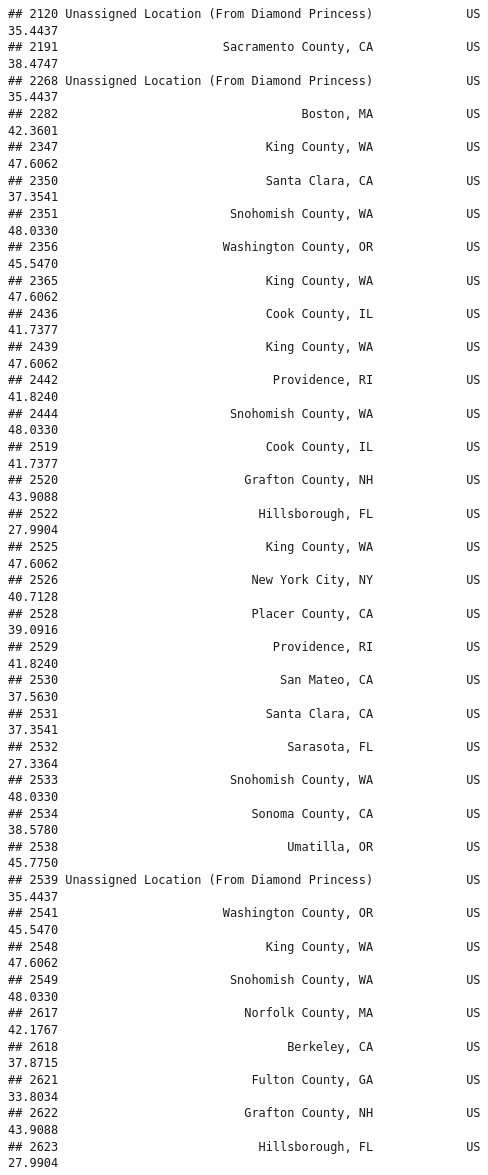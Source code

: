 \documentclass[
]{article}
\begin{document}
\begin{verbatim}
## 2120 Unassigned Location (From Diamond Princess)             US 35.4437
## 2191                       Sacramento County, CA             US 38.4747
## 2268 Unassigned Location (From Diamond Princess)             US 35.4437
## 2282                                  Boston, MA             US 42.3601
## 2347                             King County, WA             US 47.6062
## 2350                             Santa Clara, CA             US 37.3541
## 2351                        Snohomish County, WA             US 48.0330
## 2356                       Washington County, OR             US 45.5470
## 2365                             King County, WA             US 47.6062
## 2436                             Cook County, IL             US 41.7377
## 2439                             King County, WA             US 47.6062
## 2442                              Providence, RI             US 41.8240
## 2444                        Snohomish County, WA             US 48.0330
## 2519                             Cook County, IL             US 41.7377
## 2520                          Grafton County, NH             US 43.9088
## 2522                            Hillsborough, FL             US 27.9904
## 2525                             King County, WA             US 47.6062
## 2526                           New York City, NY             US 40.7128
## 2528                           Placer County, CA             US 39.0916
## 2529                              Providence, RI             US 41.8240
## 2530                               San Mateo, CA             US 37.5630
## 2531                             Santa Clara, CA             US 37.3541
## 2532                                Sarasota, FL             US 27.3364
## 2533                        Snohomish County, WA             US 48.0330
## 2534                           Sonoma County, CA             US 38.5780
## 2538                                Umatilla, OR             US 45.7750
## 2539 Unassigned Location (From Diamond Princess)             US 35.4437
## 2541                       Washington County, OR             US 45.5470
## 2548                             King County, WA             US 47.6062
## 2549                        Snohomish County, WA             US 48.0330
## 2617                          Norfolk County, MA             US 42.1767
## 2618                                Berkeley, CA             US 37.8715
## 2621                           Fulton County, GA             US 33.8034
## 2622                          Grafton County, NH             US 43.9088
## 2623                            Hillsborough, FL             US 27.9904

\end{verbatim}
\end{document}
